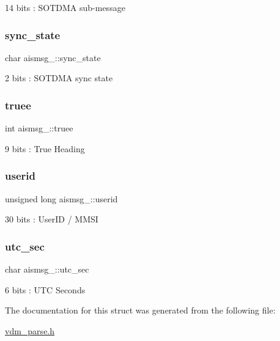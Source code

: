 14 bits \+: S\+O\+T\+D\+MA sub-\/message 

\mbox{\label{structaismsg__2_a2ead7286be168983aa969df7ff023150}} 
\subsubsection{\texorpdfstring{sync\+\_\+state}{sync\_state}}
{\footnotesize\ttfamily char aismsg\+\_\+::sync\+\_\+state}



2 bits \+: S\+O\+T\+D\+MA sync state 

\mbox{\label{structaismsg__2_ac3b0a063d1c12347d202bc2a398e4a3f}} 
\subsubsection{\texorpdfstring{truee}{truee}}
{\footnotesize\ttfamily int aismsg\+\_\+::truee}



9 bits \+: True Heading 

\mbox{\label{structaismsg__2_af350954bbb7c1f3918ff50da34a230ce}} 
\subsubsection{\texorpdfstring{userid}{userid}}
{\footnotesize\ttfamily unsigned long aismsg\+\_\+::userid}



30 bits \+: User\+ID / M\+M\+SI 

\mbox{\label{structaismsg__2_aaedf95571f256b1f7cd697319fcbf2ed}} 
\subsubsection{\texorpdfstring{utc\+\_\+sec}{utc\_sec}}
{\footnotesize\ttfamily char aismsg\+\_\+::utc\+\_\+sec}



6 bits \+: U\+TC Seconds 



The documentation for this struct was generated from the following file\+:\begin{DoxyCompactItemize}
\item 
\mbox{\hyperlink{vdm__parse_8h}{vdm\+\_\+parse.\+h}}\end{DoxyCompactItemize}
